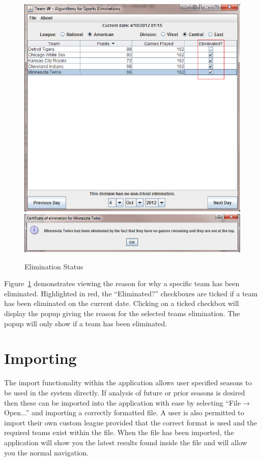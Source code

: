 \begin{figure}
  \includegraphics[width=\linewidth,keepaspectratio]{images/userManualDesk4.png}
  \includegraphics[width=\linewidth,keepaspectratio]{images/userManualDesk5.png}
  \caption{Elimination Status}\label{fig:ELIMSTAT}
\end{figure}

Figure~\ref{fig:ELIMSTAT} demonstrates viewing the reason for why a
specific team has been eliminated. Highlighted in red, the
``Eliminated?'' checkboxes are ticked if a team has been eliminated
on the current date. Clicking on a ticked checkbox will display the
popup giving the reason for the selected teams elimination. The popup
will only show if a team has been eliminated.

\newpage

\section{Importing}
\label{sec:Importing}
The import functionality within the application allows user specified
seasons to be used in the system directly. If analysis of future or
prior seasons is desired then these can be imported into the
application with ease by selecting ``File$\rightarrow$Open...'' and importing a
correctly formatted file. A user is also permitted to import their own
custom league provided that the correct format is used and the
required teams exist within the file. When the file has been imported,
the application will show you the latest results found inside the file
and will allow you the normal navigation.

